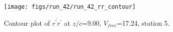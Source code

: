 \begin{figure}[H]
\centering
\texttt{[image: figs/run\_42/run\_42\_rr\_contour]}
\caption{Contour plot of $\overline{r^\prime r^\prime}$ at $z/c$=9.00, $V_{free}$=17.24, station 5.}
\label{fig:run_42_rr_contour}
\end{figure}


